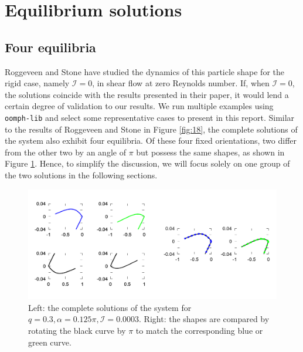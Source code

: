 \documentclass[a4paper,12pt]{report}
\begin{document}
\section{Equilibrium solutions}
\subsection{Four equilibria}
Roggeveen and Stone \cite{roggeveen2022motion} have studied the dynamics of this particle shape for the rigid case, namely $\mathcal{I}=0$, in shear flow at zero Reynolds number. If, when $\mathcal{I}=0$, the solutions coincide with the results presented in their paper, it would lend a certain degree of validation to our results.
We run multiple examples using \texttt{oomph-lib} and select some representative cases to present in this report. Similar to the results of Roggeveen and Stone in Figure \ref{fig:18}, the complete solutions of the system also exhibit four equilibria. Of these four fixed orientations, two differ from the other two by an angle of $\pi$ but possess the same shapes, as shown in Figure \ref{fig:20}. Hence, to simplify the discussion, we will focus solely on one group of the two solutions in the following sections.
\begin{figure}[!h]
	\begin{center}
		\includegraphics[width=1\textwidth]{plot/four_solutions2.png}
		\caption{Left: the complete solutions of the system for $q=0.3, \alpha=0.125\pi, \mathcal{I}=0.0003$. Right: the shapes are compared by rotating the black curve by $\pi$ to match the corresponding blue or green curve.}
		\label{fig:20}
	\end{center}
\end{figure}
\end{document}
